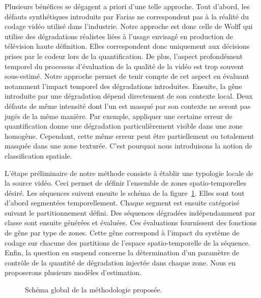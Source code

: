 Plusieurs bénéfices se dégagent a priori d'une telle approche. Tout d'abord, les défauts synthétiques introduits par Farias ne correspondent pas à la réalité du codage vidéo utilisé dans l'industrie. Notre approche est donc celle de Wolff qui utilise des dégradations réalistes liées à l'usage envisagé en production de télévision haute définition. Elles correspondent donc uniquement aux décisions prises par le codeur \avc{} lors de la quantification. De plus, l'aspect profondément temporel du processus d'évaluation de la qualité de la vidéo est trop souvent sous-estimé. Notre approche permet de tenir compte de cet aspect en évaluant notamment l'impact temporel des dégradations introduites. Ensuite, la gêne introduite par une dégradation dépend directement de son contexte local. Deux défauts de même intensité dont l'un est masqué par son contexte ne seront pas jugés de la même manière. Par exemple, appliquer une certaine erreur de quantification donne une dégradation particulièrement visible dans une zone homogène. Cependant, cette même erreur peut être partiellement ou totalement masquée dans une zone texturée. C'est pourquoi nous introduisons la notion de classification spatiale. %

L'étape préliminaire de notre méthode consiste à établir une typologie locale de la source vidéo. Ceci permet de définir l'ensemble de zones spatio-temporelles désiré. Les séquences suivent ensuite le schéma de la figure~\ref{fig:schemaGlobal}. Elles sont tout d'abord segmentées temporellement. Chaque segment est ensuite catégorisé suivant le partitionnement défini. Des séquences dégradées indépendamment par classe sont ensuite générées et évaluées. Ces évaluations fournissent des fonctions de gêne par type de zones. Cette gêne correspond à l'impact du système de codage sur chacune des partitions de l'espace spatio-temporelle de la séquence. Enfin, la question en suspend concerne la détermination d'un paramètre de contrôle de la quantité de dégradation injectée dans chaque zone. Nous en proposerons plusieurs modèles d'estimation.

\begin{figure}[htbp]
	\centering
	\begin{tikzpicture}[text centered, text width=2cm, node distance=2cm]\end{tikzpicture}
	\caption{Schéma global de la méthodologie proposée.}
	\label{fig:schemaGlobal}
\end{figure}


